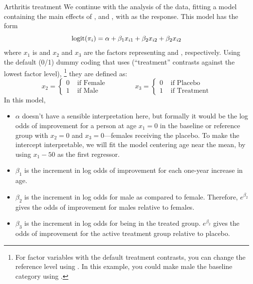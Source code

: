 \documentclass[11pt]{book}\usepackage[]{graphicx}\usepackage[]{color}
\begin{document}
\begin{Example}{Arthritis treatment}
We continue with the analysis of the  data,
fitting a model containing the main effects of ,  and ,
with  as the response. This model has the form 
\begin{equation*}
  \logit ( \pi_{i}) = \alpha + \beta_1 x_{i1} + \beta_2 x_{i2} + \beta_2 x_{i2}
\end{equation*}
where $x_1$ is  and $x_2$ and $x_3$ are the factors 
representing  and , respectively.
Using the default (0/1) dummy coding that \R uses (``treatment'' contrasts against the lowest
factor level),%
\footnote{
For factor variables with the default treatment contrasts, you can change the
reference level using .  In this example, you could make 
male the baseline category using
.
}
they are defined as: 
\begin{equation*}
 x_2 = \left\{
    \begin{array}{ll}
    0  & \mbox{ if Female} \\
    1  & \mbox{ if Male} 
    \end{array}
    \right.
 \qquad\qquad
 x_3 = \left\{
    \begin{array}{ll}
    0  & \mbox{ if Placebo} \\
    1  & \mbox{ if Treatment}
    \end{array}
    \right.
\end{equation*}
In this model,
\begin{itemize}
\item $\alpha$ doesn't have a sensible interpretation here, but formally it would be
the log odds of improvement for a person at age $x_1=0$ in
the baseline or reference group
with $x_2=0$ and $x_3=0$---females receiving the placebo.  To make the intercept
interpretable, we will fit the model centering age near the mean,
by using $x_1 - 50$ as the first regressor.

\item \(\beta_1\) is the increment in log odds of improvement for each one-year
increase in age.
\item \(\beta_2\) is the increment in log odds for male
as compared to female.
Therefore, \(e^{ \beta_2 }\) gives the odds of improvement
for males relative to females.

\item \(\beta_3\) is the increment in log odds for being in the
treated group.  \(e^{ \beta_2 }\) gives the odds of
improvement for the active treatment group relative to
placebo.
\end{itemize}


\end{Example}
\end{document}
